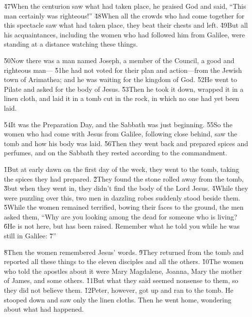 \v{47}When the centurion saw what had taken place, he praised God and said, ``This man certainly was righteous!'' \v{48}When all the crowds who had come together for this spectacle saw what had taken place, they beat their chests and left. \v{49}But all his acquaintances, including the women who had followed him from Galilee, were standing at a distance watching these things.

\v{50}Now there was a man named Joseph, a member of the Council, a good and righteous man--- \v{51}he had not voted for their plan and action---from the Jewish town of Arimathea; and he was waiting for the kingdom of God. \v{52}He went to Pilate and asked for the body of Jesus. \v{53}Then he took it down, wrapped it in a linen cloth, and laid it in a tomb cut in the rock, in which no one had yet been laid.

\v{54}It was the Preparation Day, and the Sabbath was just beginning. \v{55}So the women who had come with Jesus from Galilee, following close behind, saw the tomb and how his body was laid. \v{56}Then they went back and prepared spices and perfumes, and on the Sabbath they rested according to the commandment.

\v{1}But at early dawn on the first day of the week, they went to the tomb, taking the spices they had prepared. \v{2}They found the stone rolled away from the tomb, \v{3}but when they went in, they didn't find the body of the Lord Jesus. \v{4}While they were puzzling over this, two men in dazzling robes suddenly stood beside them. \v{5}While the women remained terrified, bowing their faces to the ground, the men asked them, ``Why are you looking among the dead for someone who is living? \v{6}He is not here, but has been raised. Remember what he told you while he was still in Galilee: \v{7}''

\v{8}Then the women remembered Jesus' words. \v{9}They returned from the tomb and reported all these things to the eleven disciples and all the others. \v{10}The women who told the apostles about it were Mary Magdalene, Joanna, Mary the mother of James, and some others. \v{11}But what they said seemed nonsense to them, so they did not believe them. \v{12}Peter, however, got up and ran to the tomb. He stooped down and saw only the linen cloths. Then he went home, wondering about what had happened.

